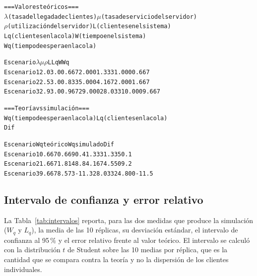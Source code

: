 \documentclass[11pt,a4paper]{article}
\begin{document}
\begin{alltt}\footnotesize
=== Valores teóricos ===
\(\lambda\) (tasa de llegada de clientes)  \(\mu\) (tasa de servicio del servidor)
\(\rho\) (utilización del servidor)  L (clientes en el sistema)
Lq (clientes en la cola)  W (tiempo en el sistema)
Wq (tiempo de espera en la cola)

Escenario          \(\lambda\)     \(\mu\)        \(\rho\)        L       Lq        W       Wq
Escenario 1      2.0   3.0    0.667    2.000    1.333    1.000    0.667
Escenario 2      2.5   3.0    0.833    5.000    4.167    2.000    1.667
Escenario 3      2.9   3.0    0.967   29.000   28.033   10.000    9.667

=== Teoría vs simulación ===
Wq (tiempo de espera en la cola)  Lq (clientes en la cola)
Dif %

Escenario       Wq teórico  Wq simulado   Dif %
Escenario 1          0.667        0.669     0.4        1.333        1.335     0.1
Escenario 2          1.667        1.814     8.8        4.167        4.550     9.2
Escenario 3          9.667        8.573   -11.3       28.033       24.800   -11.5
\end{alltt}

\subsection{Intervalo de confianza y error relativo}

La Tabla~\ref{tab:intervalos} reporta, para las dos medidas que produce la simulación
($W_q$ y $L_q$), la media de las 10 réplicas, su desviación estándar, el intervalo de
confianza al 95\,\% y el error relativo frente al valor teórico. El intervalo se calculó
con la distribución $t$ de Student sobre las 10 medias por réplica, que es la cantidad
que se compara contra la teoría y no la dispersión de los clientes individuales.
\end{document}
